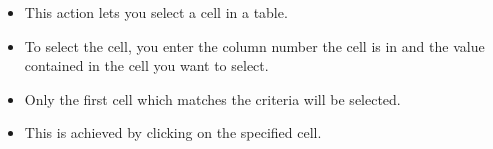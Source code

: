 
\begin{itemize}
\item This action lets you select a cell in a table.
\item To select the cell, you enter the column number the cell is in and the value contained in the cell you want to select.
\item Only the first cell which matches the criteria will be selected.
\item This is achieved by clicking on the specified cell.
\end{itemize}

 



